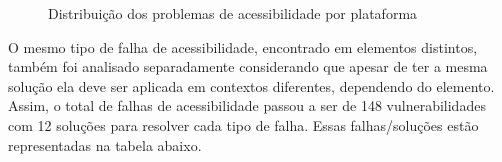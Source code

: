\documentclass[
	12pt,				%
	openright,			%
	oneside,			%
	a4paper,			%
	chapter=TITLE,		%
	section=TITLE,		%
	subsection=TITLE,	%
	subsubsection=TITLE,%
	english,			%
	brazil				%
	]{abntex2}
\theoremstyle{definition}
\begin{document}
\begin{figure}[!h]
\centering
\caption{Distribuição dos problemas de acessibilidade por plataforma}
\label{Distribuição dos problemas de acessibilidade por plataforma}
\end{figure}



O mesmo tipo de falha de acessibilidade, encontrado em elementos distintos, também foi analisado separadamente considerando que apesar de ter a mesma solução ela deve ser aplicada em contextos diferentes, dependendo do elemento. Assim, o total de falhas de acessibilidade passou a ser de 148 vulnerabilidades com 12 soluções para resolver cada tipo de falha. Essas falhas/soluções estão representadas na tabela abaixo.
\end{document}
